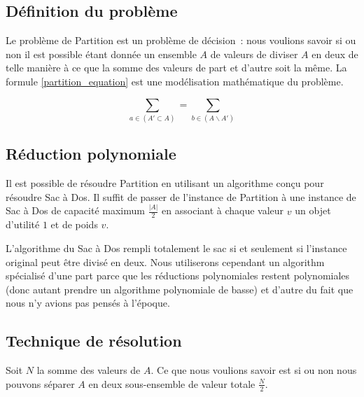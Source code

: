 \subsection{Définition du problème}

Le problème de Partition est un problème de décision~: nous voulions savoir si ou non il est possible étant donnée un ensemble $A$ de valeurs de diviser $A$ en deux de telle manière à ce que la somme des valeurs de part et d'autre soit la même. La formule \ref{partition_equation} est une modélisation mathématique du problème.

\begin{equation}
\sum_{a \in (A' \subset A) } = \sum_{b \in (A \backslash A')}
\label{partition_equation}
\end{equation}

\subsection{Réduction polynomiale}

Il est possible de résoudre Partition en utilisant un algorithme conçu pour résoudre Sac à Dos. Il suffit de passer de l'instance de Partition à une instance de Sac à Dos de capacité maximum $\frac{|A|}{2}$ en associant à chaque valeur $v$ un objet d'utilité $1$ et de poids $v$.

L'algorithme du Sac à Dos rempli totalement le sac si et seulement si l'instance original peut être divisé en deux. Nous utiliserons cependant un algorithm spécialisé d'une part parce que les réductions polynomiales restent polynomiales (donc autant prendre un algorithme polynomiale de basse) et d'autre du fait que nous n'y avions pas pensés à l'époque.  

\subsection{Technique de résolution}

Soit $N$ la somme des valeurs de $A$. Ce que nous voulions savoir est si ou non nous pouvons séparer $A$ en deux sous-ensemble de valeur totale $\frac{N}{2}$. 

